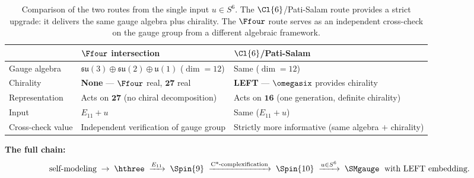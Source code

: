 \begin{table}[ht]
\centering
\small
\renewcommand{\arraystretch}{1.2}
\begin{tabular}{@{}lll@{}}
  \toprule
  & $\Ffour$ intersection & $\Cl{6}$/Pati-Salam \\
  \midrule
  Gauge algebra
    & $\mathfrak{su}(3)\oplus\mathfrak{su}(2)\oplus\mathfrak{u}(1)$ ($\dim=12$)
    & Same ($\dim=12$) \\
  Chirality
    & \textbf{None} --- $\Ffour$ real, $\mathbf{27}$ real
    & \textbf{LEFT} --- $\omegasix$ provides chirality \\
  Representation
    & Acts on $\mathbf{27}$ (no chiral decomposition)
    & Acts on $\mathbf{16}$ (one generation, definite chirality) \\
  Input
    & $E_{11} + u$
    & Same ($E_{11} + u$) \\
  Cross-check value
    & Independent verification of gauge group
    & Strictly more informative (same algebra $+$ chirality) \\
  \bottomrule
\end{tabular}
\caption{Comparison of the two routes from the single input
$u\in S^6$.  The $\Cl{6}$/Pati-Salam route provides a strict
upgrade: it delivers the same gauge algebra plus chirality.
The $\Ffour$ route serves as an independent cross-check on the
gauge group from a different algebraic framework.}
\label{tab:chiral-upgrade}
\end{table}

\noindent\textbf{The full chain:}
\begin{equation}\label{eq:full-chain}
  \text{self-modeling}
  \;\to\; \hthree
  \;\xrightarrow{E_{11}}\; \Spin{9}
  \;\xrightarrow{\text{C*-complexification}}\; \Spin{10}
  \;\xrightarrow{u\in S^6}\;
  \SMgauge
  \;\text{ with LEFT embedding.}
\end{equation}
